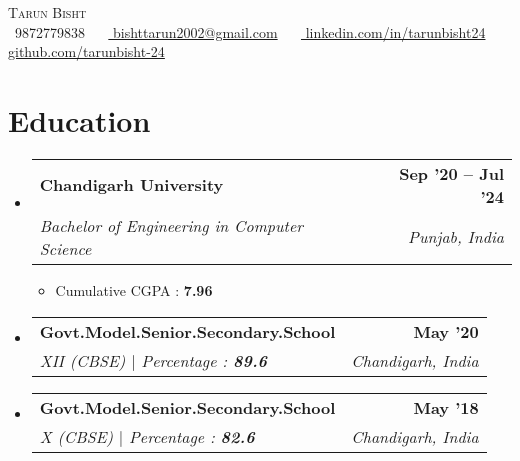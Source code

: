 \documentclass[letterpaper,11pt]{article}
\makeatletter
\newcommand{\resumeItem}[1]{
  \item\small{
    {#1 \vspace{-2pt}}
  }
}
\newcommand{\resumeSubheading}[4]{
  \vspace{-2pt}\item
    \begin{tabular*}{1.0\textwidth}[t]{l@{\extracolsep{\fill}}r}
      \textbf{#1} & \textbf{\small #2} \\
      \textit{\small#3} & \textit{\small #4} \\
    \end{tabular*}\vspace{-7pt}
}
\newcommand{\resumeSubHeadingListStart}{\begin{itemize}[leftmargin=0.0in, label={}]}
\newcommand{\resumeSubHeadingListEnd}{\end{itemize}}
\newcommand{\resumeItemListStart}{\justify \begin{itemize} \vspace{-4pt}}
\newcommand{\resumeItemListEnd}{\end{itemize}\vspace{-1pt}}
\makeatother
\begin{document}



\begin{center}
    {\Huge \scshape Tarun Bisht} \\ \vspace{1pt}
    \vspace{5pt}
    \small \raisebox{-0.1\height}\faPhone\ 9872779838 ~ 
    \raisebox{-0.2\height}\faEnvelope\ \href{mailto:bishttarun2002@gmail.com}{ bishttarun2002@gmail.com} ~ 
    \raisebox{-0.2\height}\faLinkedin\ \href{https://www.linkedin.com/in/tarunbisht24/}{ linkedin.com/in/tarunbisht24} ~
    \raisebox{-0.2\height}\faGithub\ \href{https://github.com/tarunbisht-24}{ github.com/tarunbisht-24} ~
    \vspace{-8pt}
\end{center}


\section{Education}
  \resumeSubHeadingListStart
    \resumeSubheading
      {Chandigarh University}{Sep '20 -- Jul '24}
      {Bachelor of Engineering in Computer Science}{Punjab, India}
    \resumeItemListStart
      \resumeItem{Cumulative CGPA : \textbf{7.96}}
    \resumeItemListEnd
    \resumeSubheading
      {Govt.Model.Senior.Secondary.School}{May '20}
      {XII (CBSE) $|$ Percentage : \textbf{89.6}}{Chandigarh, India}
    \resumeSubheading
      {Govt.Model.Senior.Secondary.School}{May '18}
      {X (CBSE) $|$ Percentage : \textbf{82.6}}{Chandigarh, India}
  \resumeSubHeadingListEnd

\end{document}
